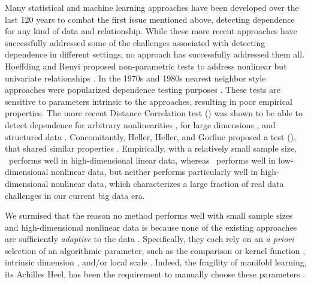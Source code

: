 \documentclass[11pt]{article}
\begin{document}
Many statistical and machine learning approaches have been developed over the last 120 years to combat the first issue mentioned above, detecting dependence for any kind of data and relationship. 
While these more recent approaches have successfully addressed some of the challenges associated with detecting dependence in different settings,  no approach has successfully addressed them all. 
Hoeffding and Renyi proposed non-parametric tests to address nonlinear but univariate relationships \cite{Hoeffding1948,Renyi1959}.  In the 1970s and 1980s nearest neighbor style approaches were popularized  dependence testing purposes \cite{Friedman1983,Schilling1986}.  These tests are sensitive to parameters intrinsic to the approaches, resulting in poor empirical properties.
The more recent Distance Correlation test (\Dcorr) was shown to be able to detect dependence  for arbitrary nonlinearities \cite{SzekelyRizzo2009}, for large dimensions \cite{SzekelyRizzo2013a}, and structured data \cite{Lyons2013}.
Concomitantly, Heller, Heller, and Gorfine proposed a test (\Hhg), that shared similar properties \cite{HellerGorfine2013}.  
Empirically, with a relatively small sample size, \Dcorr~performs well in high-dimensional linear data, whereas \Hhg~performs well in low-dimensional nonlinear data,
but neither performs particularly well in high-dimensional nonlinear data, which characterizes a large fraction of real data challenges in our current big data era. 


We surmised that the reason no method performs well with small sample sizes and high-dimensional nonlinear data is 
because none of the existing approaches are sufficiently \emph{adaptive} to the data \cite{zhang2012adaptive}.  Specifically, they each rely on an \emph{a priori} selection of an algorithmic parameter, such as the comparison or kernel function  \cite{scholkopf2002learning}, intrinsic dimension \cite{RoweisSaul2003}, and/or local scale \cite{Friedman1983,Schilling1986,Allard2012}. Indeed, the fragility of manifold learning, its Achilles Heel, has been the requirement to manually choose these parameters \cite{levina2004maximum}.
\end{document}

